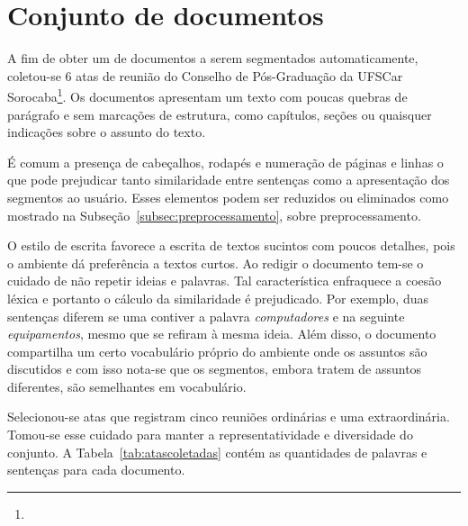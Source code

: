 
\section{Conjunto de documentos}
	\label{sec:conjutodedocumentos} 






A fim de obter um de documentos a serem segmentados automaticamente, coletou-se 6 atas de reunião do Conselho de Pós-Graduação da UFSCar Sorocaba\footnote{\urlatas}.  Os documentos apresentam um texto com poucas quebras de parágrafo e sem marcações de estrutura, como capítulos, seções ou quaisquer indicações sobre o assunto do texto.



É comum a presença de cabeçalhos, rodapés e numeração de páginas e linhas o que pode prejudicar tanto similaridade entre sentenças como a apresentação dos segmentos ao usuário. Esses elementos podem ser reduzidos ou eliminados como mostrado na Subseção~\ref{subsec:preprocessamento}, sobre preprocessamento.



O estilo de escrita favorece a escrita de textos sucintos com poucos detalhes, pois o ambiente dá preferência a textos curtos. 
% 		
Ao redigir o documento tem-se o cuidado de não repetir ideias e palavras.
Tal característica enfraquece a coesão léxica e portanto o cálculo da similaridade é prejudicado. Por exemplo, duas sentenças diferem se uma contiver a palavra \textit{computadores} e na seguinte \textit{equipamentos}, mesmo que se refiram à mesma ideia. Além disso, o documento compartilha um certo vocabulário próprio do ambiente onde os assuntos são discutidos e com isso nota-se que os segmentos, embora tratem de assuntos diferentes, são semelhantes em vocabulário.



Selecionou-se atas que registram cinco reuniões ordinárias e uma extraordinária. Tomou-se esse cuidado para manter a representatividade e diversidade do conjunto.  A Tabela~\ref{tab:atascoletadas} contém as quantidades de palavras e sentenças para cada documento.








